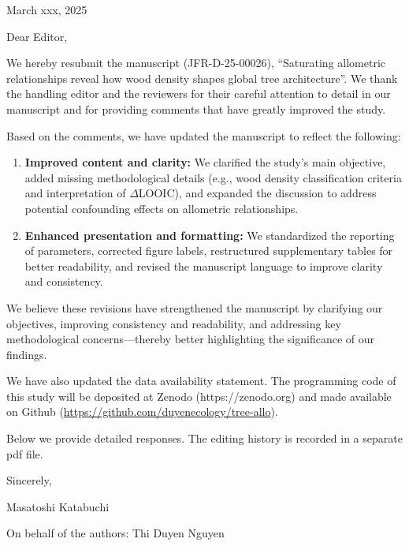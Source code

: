 \documentclass[
  12pt,
  letterpaper,
  DIV=11,
  numbers=noendperiod]{scrartcl}
\author{}
\date{}
\begin{document}
\ifdefined\Shaded\renewenvironment{Shaded}{\begin{tcolorbox}[breakable, sharp corners, boxrule=0pt, interior hidden, enhanced, frame hidden, borderline west={3pt}{0pt}{shadecolor}]}{\end{tcolorbox}}\fi

March xxx, 2025

Dear Editor,

We hereby resubmit the manuscript (JFR-D-25-00026), ``Saturating
allometric relationships reveal how wood density shapes global tree
architecture''. We thank the handling editor and the reviewers for their
careful attention to detail in our manuscript and for providing comments
that have greatly improved the study.

Based on the comments, we have updated the manuscript to reflect the
following:

\begin{enumerate}
\def\labelenumi{\arabic{enumi}.}
\item
  \textbf{Improved content and clarity:} We clarified the study's main
  objective, added missing methodological details (e.g., wood density
  classification criteria and interpretation of \(\Delta\)LOOIC), and
  expanded the discussion to address potential confounding effects on
  allometric relationships.
\item
  \textbf{Enhanced presentation and formatting:} We standardized the
  reporting of parameters, corrected figure labels, restructured
  supplementary tables for better readability, and revised the
  manuscript language to improve clarity and consistency.
\end{enumerate}

We believe these revisions have strengthened the manuscript by
clarifying our objectives, improving consistency and readability, and
addressing key methodological concerns---thereby better highlighting the
significance of our findings.

We have also updated the data availability statement. The programming
code of this study will be deposited at Zenodo (https://zenodo.org) and
made available on Github
(\url{https://github.com/duyenecology/tree-allo}).

Below we provide detailed responses. The editing history is recorded in
a separate pdf file.

Sincerely,

Masatoshi Katabuchi

On behalf of the authors: Thi Duyen Nguyen
\end{document}
